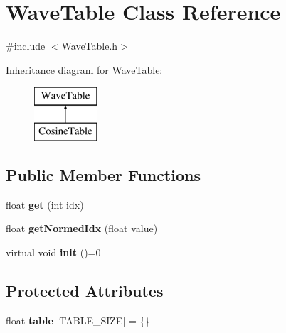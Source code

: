 \hypertarget{classWaveTable}{}\section{Wave\+Table Class Reference}
\label{classWaveTable}


{\ttfamily \#include $<$Wave\+Table.\+h$>$}

Inheritance diagram for Wave\+Table\+:\begin{figure}[H]
\begin{center}
\leavevmode
\includegraphics[height=2.000000cm]{classWaveTable}
\end{center}
\end{figure}
\subsection*{Public Member Functions}
\begin{DoxyCompactItemize}
\item 
float {\bfseries get} (int idx)\hypertarget{classWaveTable_afd23f7ecfb0b1bfb15164c49b7d9c95e}{}\label{classWaveTable_afd23f7ecfb0b1bfb15164c49b7d9c95e}

\item 
float {\bfseries get\+Normed\+Idx} (float value)\hypertarget{classWaveTable_a3fa4d93994b56dee6f0083e063dd53b5}{}\label{classWaveTable_a3fa4d93994b56dee6f0083e063dd53b5}

\item 
virtual void {\bfseries init} ()=0\hypertarget{classWaveTable_addb817963f443ed6edaba3be9b8edec5}{}\label{classWaveTable_addb817963f443ed6edaba3be9b8edec5}

\end{DoxyCompactItemize}
\subsection*{Protected Attributes}
\begin{DoxyCompactItemize}
\item 
float {\bfseries table} \mbox{[}T\+A\+B\+L\+E\+\_\+\+S\+I\+ZE\mbox{]} = \{\}\hypertarget{classWaveTable_aac70194676deffaf65f02a79f9d49aeb}{}\label{classWaveTable_aac70194676deffaf65f02a79f9d49aeb}

\end{DoxyCompactItemize}
